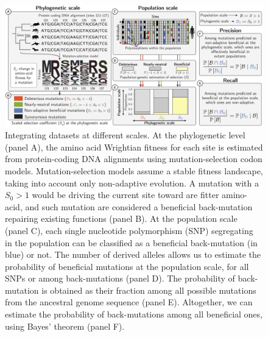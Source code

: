 \documentclass{article}
\newcommand{\Sphy}{S_{0}}
\begin{document}
    \begin{figure}[!ht]
        \centering
        \includegraphics[width=\textwidth, page=1] {artworks/figure.method.proba}
        \caption{
            Integrating datasets at different scales.
            At the phylogenetic level (panel A), the amino acid Wrightian fitness for each site is estimated from protein-coding DNA alignments using mutation-selection codon models.
            Mutation-selection models assume a stable fitness landscape, taking into account only non-adaptive evolution.
            A mutation with a $\Sphy > 1$ would be driving the current site toward are fitter amino-acid, and such mutation are considered a beneficial back-mutation repairing existing functions (panel B).
            At the population scale (panel C), each single nucleotide polymorphism (SNP) segregating in the population can be classified as a beneficial back-mutation (in blue) or not.
            The number of derived alleles allows us to estimate the probability of beneficial mutations at the population scale, for all SNPs or among back-mutations (panel D).
            The probability of back-mutation is obtained as their fraction among all possible mutations from the ancestral genome sequence (panel E).
            Altogether, we can estimate the probability of back-mutations among all beneficial ones, using Bayes' theorem (panel F).
        }
        \label{fig:method}
    \end{figure}
\end{document}
